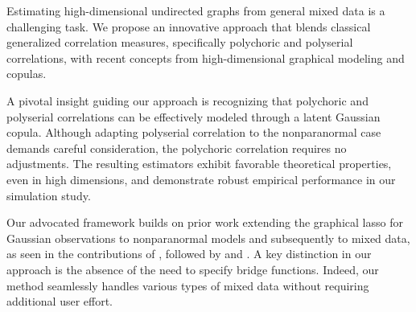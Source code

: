 Estimating high-dimensional undirected graphs from general mixed data is a challenging task. We propose an innovative approach that blends classical generalized correlation measures, specifically polychoric and polyserial correlations, with recent concepts from high-dimensional graphical modeling and copulas.

A pivotal insight guiding our approach is recognizing that polychoric and polyserial correlations can be effectively modeled through a latent Gaussian copula. Although adapting polyserial correlation to the nonparanormal case demands careful consideration, the polychoric correlation requires no adjustments. The resulting estimators exhibit favorable theoretical properties, even in high dimensions, and demonstrate robust empirical performance in our simulation study.

Our advocated framework builds on prior work extending the graphical lasso for Gaussian observations to nonparanormal models and subsequently to mixed data, as seen in the contributions of \citet{Fan17}, followed by \citet{Quan18} and \citet{Feng19}. A key distinction in our approach is the absence of the need to specify bridge functions. Indeed, our method seamlessly handles various types of mixed data without requiring additional user effort. %
